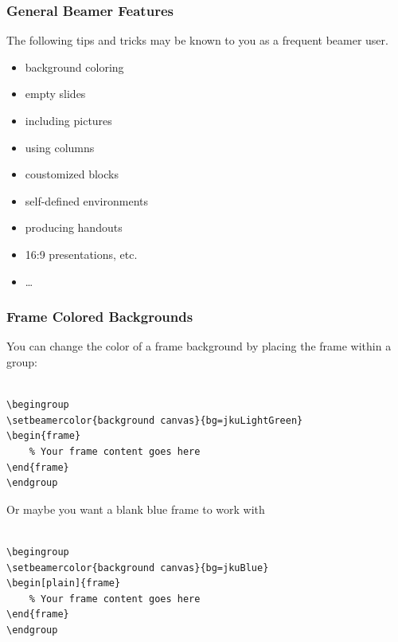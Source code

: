 \documentclass[aspectratio=169]{beamer}
\begin{document}
\begin{frame}
 \frametitle{General Beamer Features}

 The following tips and tricks may be known to you as a frequent beamer user.
 \begin{itemize}
  \item background coloring
  \item empty slides
  \item including pictures
  \item using columns
  \item coustomized blocks
  \item self-defined environments
  \item producing handouts
  \item 16:9 presentations, etc.
  \item \ldots
 \end{itemize}

\end{frame}

\begingroup
{}
\begin{frame}[containsverbatim]
\frametitle{Frame Colored Backgrounds}

You can change the color of a frame background by placing the frame within a group:

\begin{verbatim}

\begingroup
\setbeamercolor{background canvas}{bg=jkuLightGreen}
\begin{frame}
	% Your frame content goes here
\end{frame}
\endgroup
\end{verbatim}

\end{frame}
\endgroup

\begingroup
{}
\begin{frame}

Or maybe you want a blank blue frame to work with

\begin{verbatim}

\begingroup
\setbeamercolor{background canvas}{bg=jkuBlue}
\begin[plain]{frame}
	% Your frame content goes here
\end{frame}
\endgroup
\end{verbatim}

\end{frame}
\endgroup
\end{document}
